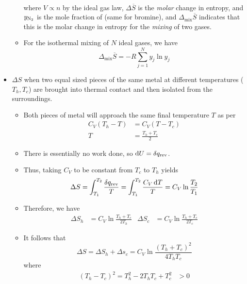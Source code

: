 \documentclass[../notes.tex]{subfiles}
\begin{document}
\begin{itemize}
\begin{itemize}
\begin{align*}
        \end{align*}
        where $V\propto n$ by the ideal gas law, $\Delta\overline{S}$ is the \emph{molar} change in entropy, and $y_{\ce{N2}}$ is the mole fraction of  (same for bromine), and $\Delta_\text{mix}\overline{S}$ indicates that this is the molar change in entropy for the \emph{mixing} of two gases.
        \item For the isothermal mixing of $N$ ideal gases, we have
        \begin{equation*}
            \Delta_\text{mix}\overline{S} = -R\sum_{j=1}^Ny_j\ln y_j
        \end{equation*}
    \end{itemize}
    \item $\Delta S$ when two equal sized pieces of the same metal at different temperatures ($T_h,T_c$) are brought into thermal contact and then isolated from the surroundings.
    \begin{itemize}
        \item Both pieces of metal will approach the same final temperature $T$ as per
        \begin{align*}
            C_V(T_h-T) &= C_V(T-T_c)\\
            T &= \frac{T_h+T_c}{2}
        \end{align*}
        \item There is essentially no work done, so $\dd{U}=\var{q_\text{rev}}$.
        \item Thus, taking $C_V$ to be constant from $T_c$ to $T_h$ yields
        \begin{equation*}
            \Delta S = \int_{T_1}^{T_2}\frac{\var{q_\text{rev}}}{T}
            = \int_{T_1}^{T_2}\frac{C_V\dd{T}}{T}
            = C_V\ln\frac{T_2}{T_1}
        \end{equation*}
        \item Therefore, we have
        \begin{align*}
            \Delta S_h &= C_V\ln\frac{T_h+T_c}{2T_h}&
            \Delta S_c &= C_V\ln\frac{T_h+T_c}{2T_c}
        \end{align*}
        \item It follows that
        \begin{equation*}
            \Delta S = \Delta S_h+\Delta s_c
            = C_V\ln\frac{(T_h+T_c)^2}{4T_hT_c}
        \end{equation*}
        where
        \begin{align*}
            (T_h-T_c)^2 = T_h^2-2T_hT_c+T_c^2 &> 0\\

\end{align*}
\end{itemize}
\end{itemize}
\end{document}
